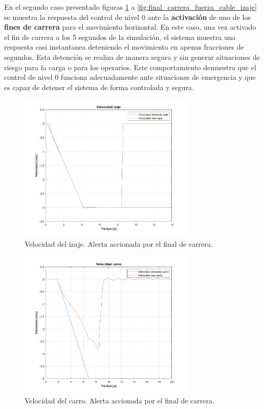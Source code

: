 \documentclass[11pt]{article}
\begin{document}
\newpage

En el segundo caso presentado figuras \ref{fig:final_carrera_velocidad_izaje} a \ref{fig:final_carrera_fuerza_cable_izaje} se muestra la respuesta del control de nivel 0 ante la \textbf{activación} de uno de los \textbf{fines de carrera} para el movimiento horizontal. En este caso, una vez activado el fin de carrera a los 5 segundos de la simulación, el sistema muestra una respuesta casi instantanea deteniendo el movimiento en apenas fracciones de segundos. Esta detención se realiza de manera segura y sin generar situaciones de riesgo para la carga o para los operarios. Este comportamiento demuestra que el control de nivel 0 funciona adecuadamente ante situaciones de emergencia y que es capaz de detener el sistema de forma controlada y segura.

\begin{figure}[!h]
	\centering
	\includegraphics[width=0.75\textwidth]{images/Freno_fin_de_carrera/velocidad_izaje.png}
	\caption{Velocidad del izaje. Alerta accionada por el final de carrera.}
	\label{fig:final_carrera_velocidad_izaje}
\end{figure}

\begin{figure}[!h]
	\centering
	\includegraphics[width=0.75\textwidth]{images/Freno_fin_de_carrera/velocidad_carro.png}
	\caption{Velocidad del carro. Alerta accionada por el final de carrera.}
	\label{fig:final_carrera_velocidad_carro}
\end{figure}
\end{document}
